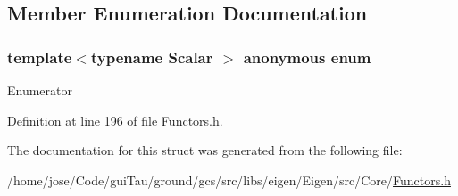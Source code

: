 \subsection{Member Enumeration Documentation}
\hypertarget{structei__functor__traits_3_01ei__scalar__abs2__op_3_01_scalar_01_4_01_4_ac1f6e9455b5e03edd0b24270bf73c72b}{\subsubsection[{anonymous enum}]{\setlength{\rightskip}{0pt plus 5cm}template$<$typename Scalar $>$ anonymous enum}}\label{structei__functor__traits_3_01ei__scalar__abs2__op_3_01_scalar_01_4_01_4_ac1f6e9455b5e03edd0b24270bf73c72b}
\begin{Desc}
\item[Enumerator]\par
\begin{description}
\item[{\em 
\hypertarget{structei__functor__traits_3_01ei__scalar__abs2__op_3_01_scalar_01_4_01_4_ac1f6e9455b5e03edd0b24270bf73c72ba6d8951f42c5182aac572fa0c40dc3740}{Cost}\label{structei__functor__traits_3_01ei__scalar__abs2__op_3_01_scalar_01_4_01_4_ac1f6e9455b5e03edd0b24270bf73c72ba6d8951f42c5182aac572fa0c40dc3740}
}]\end{description}
\end{Desc}


Definition at line 196 of file Functors.\-h.



The documentation for this struct was generated from the following file\-:\begin{DoxyCompactItemize}
\item 
/home/jose/\-Code/gui\-Tau/ground/gcs/src/libs/eigen/\-Eigen/src/\-Core/\hyperlink{_core_2_functors_8h}{Functors.\-h}\end{DoxyCompactItemize}
